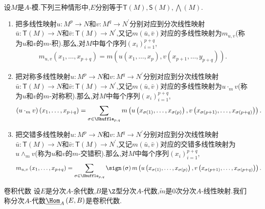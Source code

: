 \begin{example}{}{}
	设$M$是$A$-模.下列三种情形中,$E$分别等于$\mathsf{T}\left(M\right),\mathsf{S}\left(M\right),\bigwedge\left(M\right)$.
	\begin{enumerate}
		\item 把多线性映射$u:M^{p}\to N$和$v:M^{q}\to N^{\prime}$分别对应到分次线性映射$\bar{u}:\mathsf{T}\left(M\right)\to N$和$\bar{v}:\mathsf{T}\left(M\right)\to N^{\prime}$,又记$m\left(\bar{u},\bar{v}\right)$对应的多线性映射为$m_{u,v}$(称为$u$和$v$的$m$-积).那么,对$M$中每个序列$\left(x_{i}\right)_{i=1}^{p+q}$,
		\begin{align*}
			m_{u,v}\left(x_{1},\ldots,x_{p+q}\right)=m\left(u\left(x_{1},\ldots,x_{p}\right),v\left(x_{p+1},\ldots,y_{p+q}\right)\right).
		\end{align*}
		\item 把对称多线性映射$u:M^{p}\to N$和$v:M^{q}\to N^{\prime}$分别对应到分次线性映射$\bar{u}:\mathsf{T}\left(M\right)\to N$和$\bar{v}:\mathsf{T}\left(M\right)\to N^{\prime}$,又记$m\left(\bar{u},\bar{v}\right)$对应的多线性映射为$u\cdot_{m}v$(称为$u$和$v$的$m$-对称积).那么,对$M$中每个序列$\left(x_{i}\right)_{i=1}^{p+q}$,
		\begin{align*}
			\left(u\cdot_{m}v\right)\left(x_{1},\ldots,x_{p+q}\right)=\sum\limits_{\sigma\in\Shuffle_{p,q}}m\left(u\left(x_{\sigma\left(1\right)},\ldots,x_{\sigma\left(p\right)}\right),v\left(x_{\sigma\left(p+1\right)},\ldots,x_{\sigma\left(p+q\right)}\right)\right).
		\end{align*}
		\item 把交错多线性映射$u:M^{p}\to N$和$v:M^{q}\to N^{\prime}$分别对应到分次线性映射$\bar{u}:\mathsf{T}\left(M\right)\to N$和$\bar{v}:\mathsf{T}\left(M\right)\to N^{\prime}$,又记$m\left(\bar{u},\bar{v}\right)$对应的交错多线性映射为$u\wedge_{m}v$(称为$u$和$v$的$m$-交错积).那么,对$M$中每个序列$\left(x_{i}\right)_{i=1}^{p+q}$,
		\begin{align*}
			m_{u,v}\left(x_{1},\ldots,x_{p+q}\right)=\sum\limits_{\sigma\in\Shuffle_{p,q}}\sign\left(\sigma\right)m\left(u\left(x_{\sigma\left(1\right)},\ldots,x_{\sigma\left(p\right)}\right),v\left(x_{\sigma\left(p+1\right)},\ldots,x_{\sigma\left(p+q\right)}\right)\right).
		\end{align*}
	\end{enumerate}
\end{example}

\begin{definition}{卷积代数}{}
	设$E$是分次$A$-余代数,$B$是$\Z$型分次$A$-代数,$\tilde{m}$是$0$次分次$A$-线性映射.我们称分次$A$-代数$\underline{\Hom}_{A}\left(E,B\right)$是卷积代数.
\end{definition}

